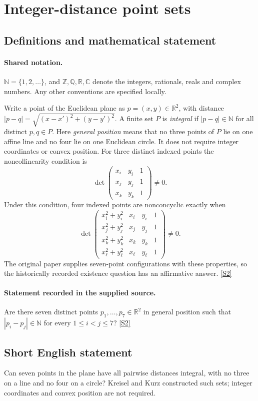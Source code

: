 \documentclass[11pt]{book}
\newcommand{\sref}[2]{\hyperlink{source:#1:#2}{[S#2]}}
\begin{document}
\section{Integer-distance point sets}\label{statement}

\subsection{Definitions and mathematical statement}

\paragraph{Shared notation.}$\mathbb N=\{1,2,\ldots\}$, and $\mathbb Z,\mathbb Q,\mathbb R,\mathbb C$ denote the integers, rationals, reals and complex numbers. Any other conventions are specified locally.


Write a point of the Euclidean plane as $p=(x,y)\in\mathbb R^2$, with distance $|p-q|=\sqrt{(x-x')^2+(y-y')^2}$. A finite set $P$ is \emph{integral} if $|p-q|\in\mathbb N$ for all distinct $p,q\in P$. Here \emph{general position} means that no three points of $P$ lie on one affine line and no four lie on one Euclidean circle. It does not require integer coordinates or convex position.
For three distinct indexed points the noncollinearity condition is
\[
\det\begin{pmatrix}x_i&y_i&1\\x_j&y_j&1\\x_k&y_k&1\end{pmatrix}\ne0.
\]
Under this condition, four indexed points are nonconcyclic exactly when
\[
\det\begin{pmatrix}
x_i^2+y_i^2&x_i&y_i&1\\
x_j^2+y_j^2&x_j&y_j&1\\
x_k^2+y_k^2&x_k&y_k&1\\
x_\ell^2+y_\ell^2&x_\ell&y_\ell&1
\end{pmatrix}\ne0.
\]
The original paper supplies seven-point configurations with these properties, so the historically recorded existence question has an affirmative answer. \sref{statement}{2}
\paragraph{Statement recorded in the supplied source.}
Are there seven distinct points $p_1,\ldots,p_7\in\mathbb R^2$ in general position such that $|p_i-p_j|\in\mathbb N$ for every $1\le i<j\le7$? \sref{statement}{2}
\subsection{Short English statement}
Can seven points in the plane have all pairwise distances integral, with no three on a line and no four on a circle? Kreisel and Kurz constructed such sets; integer coordinates and convex position are not required.
\end{document}
